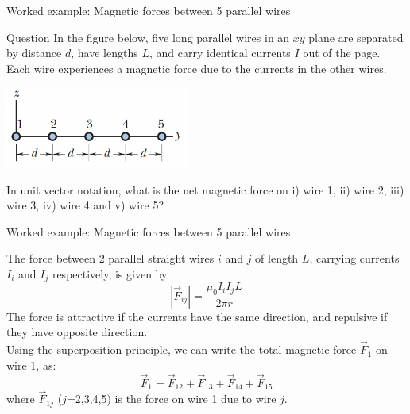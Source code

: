 {
\problemslide

%
%
%

\begin{frame}{Worked example: Magnetic forces between 5 parallel wires}

  \begin{blockexmplque}{Question}
    In the figure below, five long parallel wires in an $xy$ plane are separated
    by distance $d$, have lengths $L$, and carry identical currents $I$ out of the page.
    Each wire experiences a magnetic force due to the currents in the other wires.\\
    \begin{center}
        \includegraphics[width=0.45\textwidth]{./images/problems/lect06_5_parallel_wires.png}
    \end{center}
    \vspace{0.2cm}
    In unit vector notation, what is the net magnetic force on
    i) wire 1, ii) wire 2, iii) wire 3, iv) wire 4 and v) wire 5?
  \end{blockexmplque}

\end{frame}

%
%
%

\begin{frame}{Worked example: Magnetic forces between 5 parallel wires}

  The force between 2 parallel straight wires $i$ and $j$ of length $L$,
  carrying currents $I_i$ and $I_j$ respectively, is given by
  \begin{equation*}
    |\vec{F}_{ij}| = \frac{\mu_0 I_{i} I_{j} L}{2 \pi r}
  \end{equation*}
  The force is attractive if the currents have the same direction,
  and repulsive if they have opposite direction. \\

  \vspace{0.2cm}
  Using the superposition principle, we can write the total magnetic force
  $\vec{F}_{1}$ on wire 1, as:
  \begin{equation*}
    \vec{F}_{1} = \vec{F}_{12} + \vec{F}_{13} + \vec{F}_{14} + \vec{F}_{15}
  \end{equation*}
  where $\vec{F}_{1j}$ ($j$=2,3,4,5) is the force on wire 1 due to wire $j$.\\


\end{frame}}
